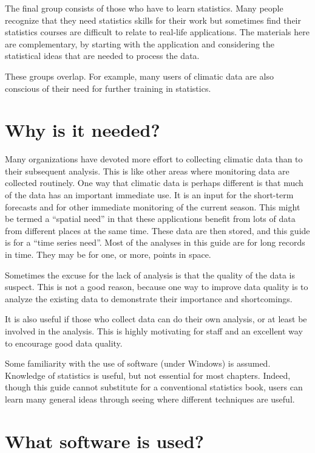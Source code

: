 \documentclass[
  letterpaper,
  DIV=11,
  numbers=noendperiod]{scrreprt}
\begin{document}
The final group consists of those who have to learn statistics. Many
people recognize that they need statistics skills for their work but
sometimes find their statistics courses are difficult to relate to
real-life applications. The materials here are complementary, by
starting with the application and considering the statistical ideas that
are needed to process the data.

These groups overlap. For example, many users of climatic data are also
conscious of their need for further training in statistics.

\section{Why is it needed?}\label{why-is-it-needed}

Many organizations have devoted more effort to collecting climatic data
than to their subsequent analysis. This is like other areas where
monitoring data are collected routinely. One way that climatic data is
perhaps different is that much of the data has an important immediate
use. It is an input for the short-term forecasts and for other immediate
monitoring of the current season. This might be termed a ``spatial
need'' in that these applications benefit from lots of data from
different places at the same time. These data are then stored, and this
guide is for a ``time series need''. Most of the analyses in this guide
are for long records in time. They may be for one, or more, points in
space.

Sometimes the excuse for the lack of analysis is that the quality of the
data is suspect. This is not a good reason, because one way to improve
data quality is to analyze the existing data to demonstrate their
importance and shortcomings.

It is also useful if those who collect data can do their own analysis,
or at least be involved in the analysis. This is highly motivating for
staff and an excellent way to encourage good data quality.

Some familiarity with the use of software (under Windows) is assumed.
Knowledge of statistics is useful, but not essential for most chapters.
Indeed, though this guide cannot substitute for a conventional
statistics book, users can learn many general ideas through seeing where
different techniques are useful.

\section{What software is used?}\label{what-software-is-used}
\end{document}
